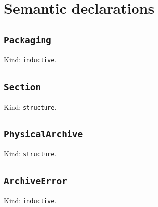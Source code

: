 \documentclass[11pt]{article}
\begin{document}
\section*{Semantic declarations}
\subsection*{\texttt{Packaging}}
\noindent Kind: \texttt{inductive}.\par
\subsection*{\texttt{Section}}
\noindent Kind: \texttt{structure}.\par
\subsection*{\texttt{PhysicalArchive}}
\noindent Kind: \texttt{structure}.\par
\subsection*{\texttt{ArchiveError}}
\noindent Kind: \texttt{inductive}.\par
\end{document}
